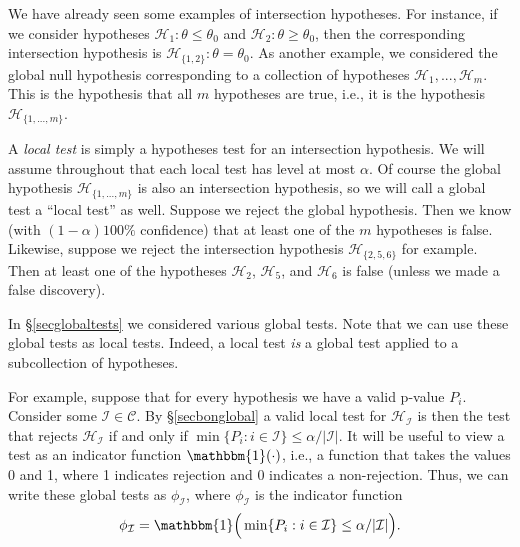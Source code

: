 \documentclass[11pt]{article}
\theoremstyle{plain}
\theoremstyle{definition}
\newcommand{\I}{\mathcal{I}}
\newcommand{\Hy}{\mathcal{H}}
\newcommand{\subs}{\mathcal{C}}
\begin{document}
We have already seen some examples of intersection hypotheses. For instance, if  we consider hypotheses $\Hy_1:\theta\leq \theta_0$ and $\Hy_2:\theta\geq \theta_0$, then the corresponding intersection hypothesis is $\Hy_{\{1,2\}}:\theta= \theta_0$. As another example, we considered the global null hypothesis corresponding to a collection of hypotheses $\Hy_1,...,\Hy_m$. This is the hypothesis that all $m$ hypotheses are true, i.e., it is the hypothesis $\Hy_{\{1,...,m\}}$.

A \emph{local test} is simply a hypotheses test  for an intersection hypothesis. We will assume throughout that each local test has level at most $\alpha$.
Of course the global hypothesis $\Hy_{\{1,...,m\}}$ is also an intersection hypothesis, so we will call a global test a ``local test'' as well. Suppose we reject the global hypothesis. Then we know (with $(1-\alpha)100\%$ confidence) that at least one of the $m$ hypotheses is false. Likewise, suppose we reject the intersection hypothesis $\Hy_{\{2,5,6\}}$ for example. Then at least one of the hypotheses $\Hy_2$, $\Hy_5$, and $\Hy_6$ is false (unless we made a false discovery).

In \S\ref{secglobaltests} we considered various global tests. Note that we can use these global tests as local tests. Indeed, a local test \emph{is} a global test applied to a subcollection of hypotheses.



For example, suppose that for every hypothesis we have a valid p-value $P_i$. Consider some $\I\in \subs$. %
By \S\ref{secbonglobal} a valid local test for $\Hy_{\I}$ is then the test that rejects $\Hy_{\I}$ if and only if $\min\{P_i:i\in \I\}\leq \alpha/|\I|$. It will be useful to view a test as an indicator function $\mathbbm{1}(\cdot)$, i.e., a function  that takes the values 0 and 1, where 1 indicates rejection and 0 indicates a non-rejection. Thus, we can write these global tests as $\phi_{\I}$, where $\phi_{\I}$ is the indicator function
\begin{equation} \label{ltBon}
\phi_{\I}=\mathbbm{1}\Big(\min\{P_i:i\in \I\}\leq \alpha/|\I|\Big).
\end{equation}
\end{document}
